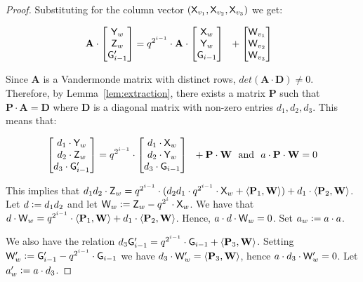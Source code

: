 \documentclass[12pt]{article}
\theoremstyle{Definition}
\begin{document}
\begin{proof}
Substituting for the column vector $(\mathsf{X}_{v_1}, \mathsf{X}_{v_2}, \mathsf{X}_{v_3})$ we get: 

$$  \mathbf{A} \cdot 
\begin{bmatrix}
\mathsf{Y}_w \\ 
\mathsf{Z}_w \\ 
\mathsf{G}'_{i-1}
\end{bmatrix} 
= 
q^{2^{i-1}} \cdot \mathbf{A} \cdot  
\begin{bmatrix}
\mathsf{X}_{w} \\ 
\mathsf{Y}_{w} \\ 
\mathsf{G}_{i-1}
\end{bmatrix}  \ \
+ 
\begin{bmatrix}
\mathsf{W}_{v_1} \\ 
\mathsf{W}_{v_2} \\ 
\mathsf{W}_{v_3}
\end{bmatrix}  \ \
$$

Since $\mathbf{A}$ is a Vandermonde matrix with distinct rows, $det(\mathbf{A} \cdot \mathbf{D}) \neq 0$. Therefore, by Lemma~\ref{lem:extraction}, there exists a matrix $\mathbf{P}$ such that $\mathbf{P}\cdot \mathbf{A} = \mathbf{D}$ where $\mathbf{D}$ is a diagonal matrix with non-zero entries $d_1, d_2, d_3$. This means that: 

$$  
\begin{bmatrix}
d_1 \cdot \mathsf{Y}_w \\ 
d_2 \cdot \mathsf{Z}_w \\ 
d_3 \cdot \mathsf{G}'_{i-1}
\end{bmatrix} 
= 
q^{2^{i-1}} \cdot
\begin{bmatrix}
d_1 \cdot \mathsf{X}_{w} \\ 
d_2 \cdot \mathsf{Y}_{w} \\ 
d_3 \cdot \mathsf{G}_{i-1}
\end{bmatrix}  \ \
+ 
\mathbf{P} \cdot 
\mathbf{W} \ \ \text{and} \ \ a \cdot \mathbf{P} \cdot \mathbf{W} = 0
$$

This implies that $d_1 d_2 \cdot \mathsf{Z}_w = q^{2^{i-1}} \cdot (d_2 d_1 \cdot q^{2^{i-1}} \cdot \mathsf{X}_w + \langle \mathbf{P}_1, \mathbf{W} \rangle) + d_1 \cdot \langle \mathbf{P}_2, \mathbf{W} \rangle$. Let $d \mathrel{\mathop:}= d_1 d_2$ and let $\mathsf{W}_w \mathrel{\mathop:}= \mathsf{Z}_w - q^{2^{i}} \cdot \mathsf{X}_w$. 
We have that $d \cdot \mathsf{W}_w = q^{2^{i-1}} \cdot \langle \mathbf{P}_1, \mathbf{W} \rangle  + d_1 \cdot \langle \mathbf{P}_2, \mathbf{W} \rangle$. Hence, $a \cdot d \cdot \mathsf{W}_w = 0$. Set $a_w \mathrel{\mathop:}= a \cdot a$. 
 
We also have the relation $d_3 \mathsf{G}'_{i-1} = q^{2^{i-1}} \cdot \mathsf{G}_{i-1} + \langle \mathbf{P}_3, \mathbf{W} \rangle$. Setting $\mathsf{W}'_w \mathrel{\mathop:}= \mathsf{G}'_{i-1} - q^{2^{i-1}} \cdot \mathsf{G}_{i-1}$ we have $d_3 \cdot \mathsf{W}'_w = \langle \mathbf{P}_3, \mathbf{W} \rangle$, hence $a \cdot d_3 \cdot \mathsf{W}'_w = 0$. Let $a'_w \mathrel{\mathop:}= a \cdot d_3$.  
	\end{proof}
\end{document}

